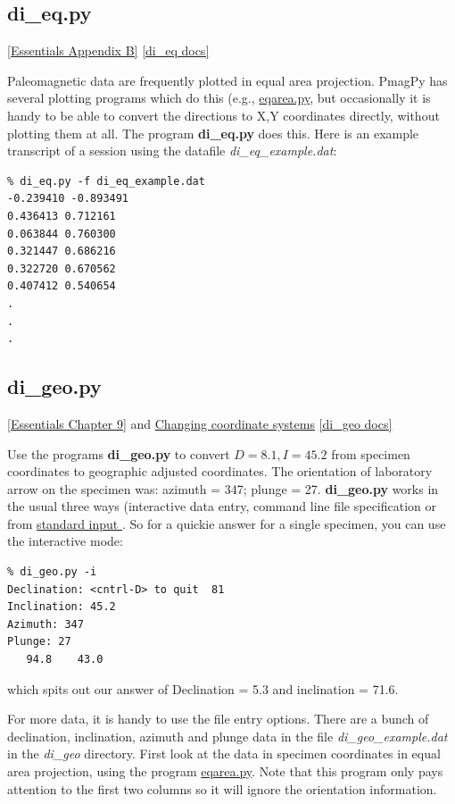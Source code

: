 \documentclass[11pt]{book}
\begin{document}
{{{
\subsection{di\_eq.py}
\href{http://magician.ucsd.edu/Essentials_2/WebBook2ap2.html#equal_area}{[Essentials Appendix B]}
\href{http://earthref.org/PmagPy/pmagpydocs/di_eq-module.html}{[di\_eq docs]}

Paleomagnetic data are frequently plotted in equal area projection.  PmagPy has several plotting programs which do this (e.g., \href{#eqarea.py}{eqarea.py}, but occasionally it is handy to be able to convert the directions to X,Y coordinates directly, without plotting them at all.  The program {\bf di\_eq.py} does this.  Here is an example transcript of a session using the datafile {\it di\_eq\_example.dat}:

\begin{verbatim}
% di_eq.py -f di_eq_example.dat
-0.239410 -0.893491
0.436413 0.712161
0.063844 0.760300
0.321447 0.686216
0.322720 0.670562
0.407412 0.540654
.
.
.
\end{verbatim}

\subsection{di\_geo.py} 
\href{http://magician.ucsd.edu/Essentials_2/WebBook2ch9.html#ch9}{[Essentials Chapter 9]} and
\href{http://magician.ucsd.edu/Essentials_2/WebBook2ap1.html#Changing_coordinate_systems}{Changing coordinate systems}
\href{http://earthref.org/PmagPy/pmagpydocs/di_geo-module.html}{[di\_geo docs]}

Use the programs {\bf di\_geo.py}  to convert
$D=8.1, I=45.2$ from specimen coordinates  to geographic  adjusted coordinates. The
orientation of laboratory arrow on the specimen was: azimuth = 347;
plunge = 27.  
{\bf di\_geo.py} works in the usual three ways (interactive data entry, command line file specification or from  \href{#standard_IO}{standard input }.  So for a quickie answer for a single specimen, you can use the interactive mode:

\begin{verbatim}
% di_geo.py -i
Declination: <cntrl-D> to quit  81
Inclination: 45.2
Azimuth: 347
Plunge: 27
   94.8    43.0
\end{verbatim}
\noindent which spits out our answer of Declination = 5.3 and inclination = 71.6.  

For more data, it is handy to use the file entry options. There are a bunch of declination, inclination, azimuth and plunge data in the file {\it di\_geo\_example.dat} in the {\it di\_geo} directory.  First look at the data in specimen coordinates in equal area projection, using the program \href{#eqarea.py}{eqarea.py}.  Note that this program only pays attention to the first two columns so it will ignore the orientation information. 

}}}
\end{document}
